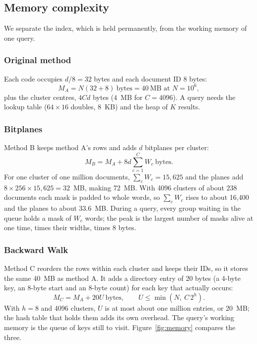 \subsection{Memory complexity}
We separate the index, which is held permanently, from the working memory of one query.

\subsubsection{Original method}
Each code occupies $d/8=32$ bytes and each document ID 8 bytes:
\[
 M_A=N(32+8)\ \text{bytes}=40\ \text{MB at }N=10^6,
\]
plus the cluster centres, $4Cd$ bytes ($4$~MB for $C=4096$). A query needs the lookup
table ($64\times16$ doubles, 8~KB) and the heap of $K$ results.

\subsubsection{Bitplanes}
Method B keeps method A's rows and adds $d$ bitplanes per cluster:
\[
 M_B=M_A+8d\sum_{c=1}^{C}W_c\ \text{bytes}.
\]
For one cluster of one million documents, $\sum_c W_c=15{,}625$ and the planes add
$8\times256\times15{,}625=32$~MB, making 72~MB. With 4096 clusters of about 238 documents
each mask is padded to whole words, so $\sum_c W_c$ rises to about 16,400 and the planes to
about 33.6~MB. During a query, every group waiting in the queue holds a mask of $W_c$
words; the peak is the largest number of masks alive at one time, times their widths, times
8 bytes.

\subsubsection{Backward Walk}
Method C reorders the rows within each cluster and keeps their IDs, so it stores the same
40~MB as method A. It adds a directory entry of 20 bytes (a 4-byte key, an 8-byte start and
an 8-byte count) for each key that actually occurs:
\[
 M_C=M_A+20U\ \text{bytes},\qquad U\le\min\!\left(N,\ C\,2^h\right).
\]
With $h=8$ and 4096 clusters, $U$ is at most about one million entries, or 20~MB; the hash
table that holds them adds its own overhead. The query's working memory is the queue of keys
still to visit. Figure~\ref{fig:memory} compares the three.

